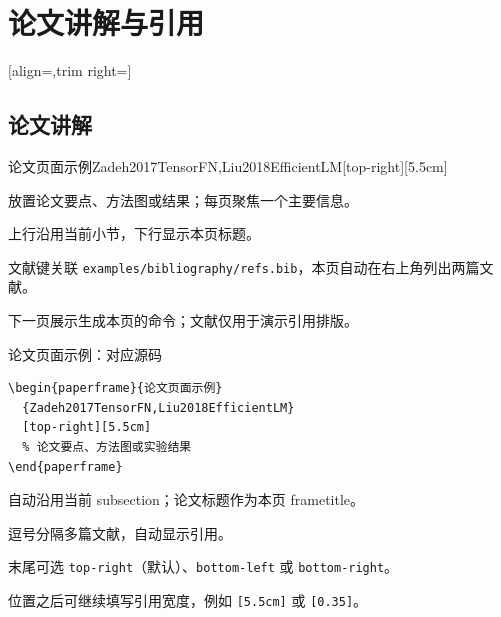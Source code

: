 \section{论文讲解与引用}
\sectiontocpage
{}
[align=\campusexamplesectionalign,trim right=\campusexamplesectiontrim]
\subsection{论文讲解}

\begin{paperframe}{论文页面示例}{Zadeh2017TensorFN,Liu2018EfficientLM}[top-right][5.5cm]
      \begin{description}[引用]
            \item[正文] 放置论文要点、方法图或结果；每页聚焦一个主要信息。
            \item[页眉] 上行沿用当前小节，下行显示本页标题。
            \item[引用] 文献键关联 \texttt{examples/bibliography/refs.bib}，本页自动在右上角列出两篇文献。
      \end{description}
      \medskip
      下一页展示生成本页的命令；文献仅用于演示引用排版。
\end{paperframe}

\begin{frame}[fragile]{论文页面示例：对应源码}
      \begin{verbatim}
\begin{paperframe}{论文页面示例}
  {Zadeh2017TensorFN,Liu2018EfficientLM}
  [top-right][5.5cm]
  % 论文要点、方法图或实验结果
\end{paperframe}
      \end{verbatim}
      \begin{description}[文献键]
            \item[页眉] 自动沿用当前 subsection；论文标题作为本页 frametitle。
            \item[文献键] 逗号分隔多篇文献，自动显示引用。
            \item[位置] 末尾可选 \texttt{top-right}（默认）、\texttt{bottom-left} 或 \texttt{bottom-right}。
            \item[宽度] 位置之后可继续填写引用宽度，例如 \texttt{[5.5cm]} 或 \texttt{[0.35\string\paperwidth]}。
      \end{description}
\end{frame}

